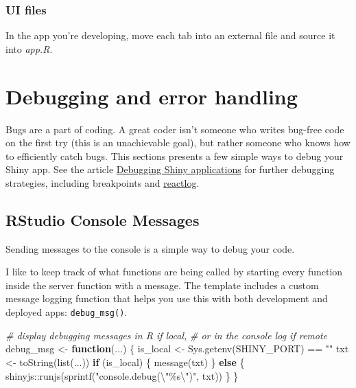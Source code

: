\documentclass[
]{book}
\newenvironment{Shaded}{\begin{snugshade}}{\end{snugshade}}
\newcommand{\CommentTok}[1]{\textcolor[rgb]{0.56,0.35,0.01}{\textit{#1}}}
\newcommand{\ControlFlowTok}[1]{\textcolor[rgb]{0.13,0.29,0.53}{\textbf{#1}}}
\newcommand{\FunctionTok}[1]{\textcolor[rgb]{0.00,0.00,0.00}{#1}}
\newcommand{\NormalTok}[1]{#1}
\newcommand{\OtherTok}[1]{\textcolor[rgb]{0.56,0.35,0.01}{#1}}
\newcommand{\SpecialCharTok}[1]{\textcolor[rgb]{0.00,0.00,0.00}{#1}}
\newcommand{\StringTok}[1]{\textcolor[rgb]{0.31,0.60,0.02}{#1}}
\begin{document}
\hypertarget{ui-files}{%
\subsection{UI files}\label{ui-files}}

In the app you're developing, move each tab into an external file and source it into \emph{app.R}.

\hypertarget{debugging}{%
\chapter{Debugging and error handling}\label{debugging}}

Bugs are a part of coding. A great coder isn't someone who writes bug-free code on the first try (this is an unachievable goal), but rather someone who knows how to efficiently catch bugs. This sections presents a few simple ways to debug your Shiny app. See the article \href{https://shiny.rstudio.com/articles/debugging.html}{Debugging Shiny applications} for further debugging strategies, including breakpoints and \href{https://rstudio.github.io/reactlog/}{reactlog}.

\hypertarget{rstudio-console-messages}{%
\section{RStudio Console Messages}\label{rstudio-console-messages}}

Sending messages to the console is a simple way to debug your code.

I like to keep track of what functions are being called by starting every function inside the server function with a message. The template includes a custom message logging function that helps you use this with both development and deployed apps: \texttt{debug\_msg()}.

\begin{Shaded}
\begin{Highlighting}[]
\CommentTok{\# display debugging messages in R if local, }
\CommentTok{\# or in the console log if remote}
\NormalTok{debug\_msg }\OtherTok{\textless{}{-}} \ControlFlowTok{function}\NormalTok{(...) \{}
\NormalTok{  is\_local }\OtherTok{\textless{}{-}} \FunctionTok{Sys.getenv}\NormalTok{(}\StringTok{\textquotesingle{}SHINY\_PORT\textquotesingle{}}\NormalTok{) }\SpecialCharTok{==} \StringTok{""}
\NormalTok{  txt }\OtherTok{\textless{}{-}} \FunctionTok{toString}\NormalTok{(}\FunctionTok{list}\NormalTok{(...))}
  \ControlFlowTok{if}\NormalTok{ (is\_local) \{}
    \FunctionTok{message}\NormalTok{(txt)}
\NormalTok{  \} }\ControlFlowTok{else}\NormalTok{ \{}
\NormalTok{    shinyjs}\SpecialCharTok{::}\FunctionTok{runjs}\NormalTok{(}\FunctionTok{sprintf}\NormalTok{(}\StringTok{"console.debug(}\SpecialCharTok{\textbackslash{}"}\StringTok{\%s}\SpecialCharTok{\textbackslash{}"}\StringTok{)"}\NormalTok{, txt))}
\NormalTok{  \}}
\NormalTok{\}}
\end{Highlighting}
\end{Shaded}
\end{document}
